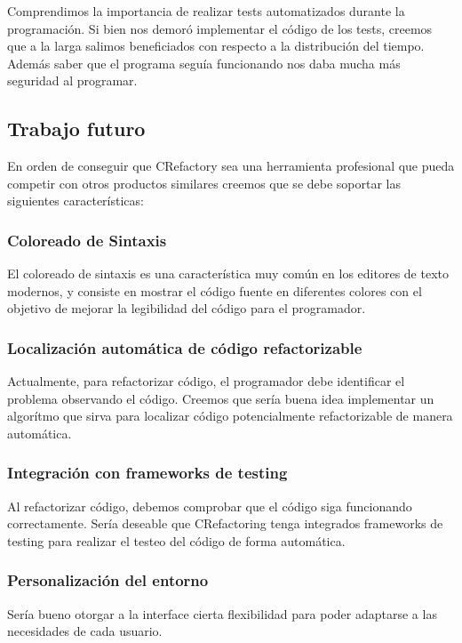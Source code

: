 \documentclass[a4paper,oneside,12pt]{article}
\begin{document}
Comprendimos la importancia de realizar tests automatizados durante la programaci\'on. Si bien nos demor\'o implementar el c\'odigo de los tests, creemos que a la larga salimos beneficiados con respecto a la distribuci\'on del tiempo. Adem\'as saber que el programa segu\'ia funcionando nos daba mucha m\'as seguridad al programar.

\subsection{Trabajo futuro}
En orden de conseguir que CRefactory sea una herramienta profesional que pueda competir con otros productos similares creemos que se debe soportar las siguientes caracter\'isticas:

\subsubsection{Coloreado de Sintaxis}
El coloreado de sintaxis es una caracter\'istica muy com\'un en los editores de texto modernos, y consiste en mostrar el c\'odigo fuente en diferentes colores con el objetivo de mejorar la legibilidad del c\'odigo para el programador.

\subsubsection{Localizaci\'on autom\'atica de c\'odigo refactorizable}
Actualmente, para refactorizar c\'odigo, el programador debe identificar el problema observando el c\'odigo. Creemos que ser\'ia buena idea implementar un algor\'itmo que sirva para localizar c\'odigo potencialmente refactorizable de manera autom\'atica.

\subsubsection{Integraci\'on con frameworks de testing}
Al refactorizar c\'odigo, debemos comprobar que el c\'odigo siga funcionando correctamente. Ser\'ia deseable que CRefactoring tenga integrados frameworks de testing para realizar el testeo del c\'odigo de forma autom\'atica.

\subsubsection{Personalizaci\'on del entorno}
Ser\'ia bueno otorgar a la interface cierta flexibilidad para poder adaptarse a las necesidades de cada usuario.
\end{document}
